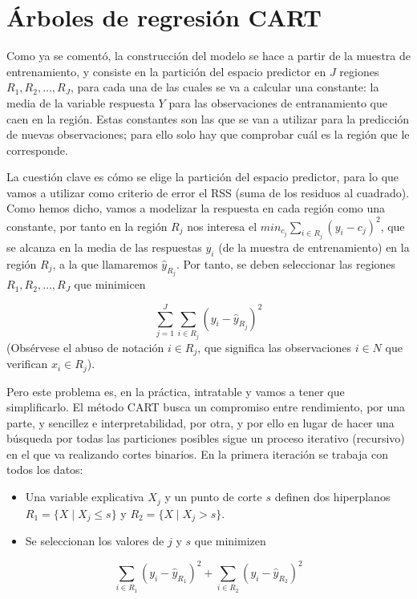 \documentclass[]{book}
\theoremstyle{break}
\theoremstyle{definition}
\theoremstyle{definition}
\theoremstyle{definition}
\theoremstyle{remark}
\begin{document}
\section{Árboles de regresión
CART}\label{uxe1rboles-de-regresiuxf3n-cart}

Como ya se comentó, la construcción del modelo se hace a partir de la
muestra de entrenamiento, y consiste en la partición del espacio
predictor en \(J\) regiones \(R_1, R_2, \ldots, R_J\), para cada una de
las cuales se va a calcular una constante: la media de la variable
respuesta \(Y\) para las observaciones de entranamiento que caen en la
región. Estas constantes son las que se van a utilizar para la
predicción de nuevas observaciones; para ello solo hay que comprobar
cuál es la región que le corresponde.

La cuestión clave es cómo se elige la partición del espacio predictor,
para lo que vamos a utilizar como criterio de error el RSS (suma de los
residuos al cuadrado). Como hemos dicho, vamos a modelizar la respuesta
en cada región como una constante, por tanto en la región \(R_j\) nos
interesa el \(min_{c_j} \sum_{i\in R_j} (y_i - c_j)^2\), que se alcanza
en la media de las respuestas \(y_i\) (de la muestra de entrenamiento)
en la región \(R_j\), a la que llamaremos \(\widehat y_{R_j}\). Por
tanto, se deben seleccionar las regiones \(R_1, R_2, \ldots, R_J\) que
minimicen

\[\sum_{j=1}^{J} \sum_{i\in R_j} (y_i - \widehat y_{R_j})^2\] (Obsérvese
el abuso de notación \(i\in R_j\), que significa las observaciones
\(i\in N\) que verifican \(x_i \in R_j\)).

Pero este problema es, en la práctica, intratable y vamos a tener que
simplificarlo. El método CART busca un compromiso entre rendimiento, por
una parte, y sencillez e interpretabilidad, por otra, y por ello en
lugar de hacer una búsqueda por todas las particiones posibles sigue un
proceso iterativo (recursivo) en el que va realizando cortes binarios.
En la primera iteración se trabaja con todos los datos:

\begin{itemize}
\item
  Una variable explicativa \(X_j\) y un punto de corte \(s\) definen dos
  hiperplanos \(R_1 = \{ X \mid X_j \le s \}\) y
  \(R_2 = \{ X \mid X_j > s \}\).
\item
  Se seleccionan los valores de \(j\) y \(s\) que minimizen
\end{itemize}

\[ \sum_{i\in R_1} (y_i - \widehat y_{R_1})^2 + \sum_{i\in R_2} (y_i - \widehat y_{R_2})^2\]
\end{document}
